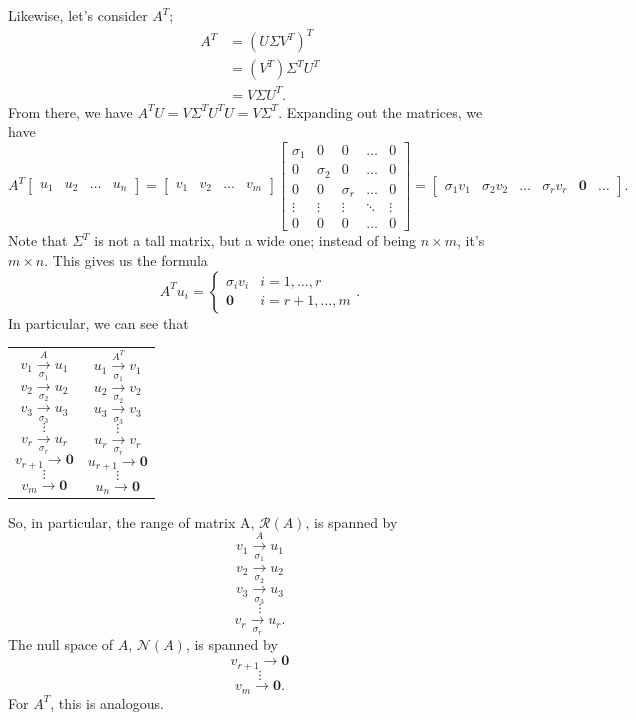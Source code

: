 \documentclass[letterpaper]{article}
\newcommand{\0}{\mathbf{0}}
\begin{document}
Likewise, let's consider $A^T$; 
\begin{equation*}
    \begin{aligned}
        A^T &= (U\Sigma V^T)^T \\ 
            &= (V^T) \Sigma^T U^T \\ 
            &= V\Sigma U^T.
    \end{aligned}
\end{equation*}
From there, we have $A^T U = V\Sigma^T U^T U = V\Sigma^T.$ Expanding out the matrices, we have 
\[A^T \begin{bmatrix}
    u_1 & u_2 & \hdots & u_n
\end{bmatrix} = \begin{bmatrix}
    v_1 & v_2 & \hdots & v_m
\end{bmatrix} \begin{bmatrix}
    \sigma_1 & 0 & 0 & \hdots & 0 \\ 
    0 & \sigma_2 & 0 & \hdots & 0 \\ 
    0 & 0 & \sigma_r & \hdots & 0 \\ 
    \vdots & \vdots & \vdots & \ddots & \vdots \\
    0 & 0 & 0 & \hdots & 0
\end{bmatrix} = \begin{bmatrix}
    \sigma_1 v_1 & \sigma_2 v_2 & \hdots & \sigma_r v_r & \0 & \hdots
\end{bmatrix}.\]
Note that $\Sigma^T$ is not a tall matrix, but a wide one; instead of being $n \times m$, it's $m \times n$. This gives us the formula
\[A^T u_i = \begin{cases}
    \sigma_i v_i & i = 1, \hdots, r \\ 
    \0 & i = r + 1, \hdots, m
\end{cases}.\] In particular, we can see that 
\begin{center}
    \begin{tabular}{p{2in} p{2in}}
        \[v_1 \xrightarrow[\sigma_1]{A} u_1\]
        \[v_2 \xrightarrow[\sigma_2]{} u_2\]
        \[v_3 \xrightarrow[\sigma_3]{} u_3\]
        \[\vdots\]
        \[v_r \xrightarrow[\sigma_r]{} u_r\]
        \[v_{r + 1} \xrightarrow{} \0\]
        \[\vdots\]
        \[v_{m} \xrightarrow{} \0\] &  
        \[u_1 \xrightarrow[\sigma_1]{A^T} v_1\]
        \[u_2 \xrightarrow[\sigma_2]{} v_2\]
        \[u_3 \xrightarrow[\sigma_3]{} v_3\]
        \[\vdots\]
        \[u_r \xrightarrow[\sigma_r]{} v_r\]
        \[u_{r + 1} \xrightarrow{} \0\]
        \[\vdots\]
        \[u_{n} \xrightarrow{} \0\]
    \end{tabular}
\end{center}
So, in particular, the range of matrix A, $\mathcal{R}(A)$, is spanned by 
\[v_1 \xrightarrow[\sigma_1]{A} u_1\]
\[v_2 \xrightarrow[\sigma_2]{} u_2\]
\[v_3 \xrightarrow[\sigma_3]{} u_3\]
\[\vdots\]
\[v_r \xrightarrow[\sigma_r]{} u_r.\]
The null space of $A$, $\mathcal{N}(A)$, is spanned by 
\[v_{r + 1} \xrightarrow{} \0\]
\[\vdots\]
\[v_{m} \xrightarrow{} \0.\]
For $A^T$, this is analogous.
\end{document}

